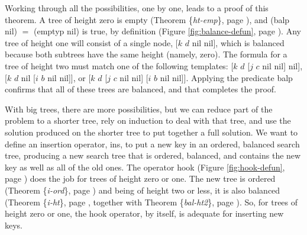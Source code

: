 Working through all the possibilities, one by one,
leads to a proof of this theorem.
A tree of height zero is empty
(Theorem \{\emph{ht-emp}\}, page \pageref{thm:ht-emp}),
and \textsf{(balp nil)} $=$ \textsf{(emptyp nil)} is true, by definition
(Figure \ref{fig:balance-defun}, page \pageref{fig:balance-defun}).
Any tree of height one will consist of a single node,
\textsf{[$k$ $d$ nil nil]}, which is balanced because both subtrees
have the same height (namely, zero).
The formula for a tree of height two must match one of the following templates:
\textsf{[$k$ $d$ [$j$ $c$ nil nil] nil]}, \textsf{[$k$ $d$ nil [$i$ $b$ nil nil]]},
or \textsf{[$k$ $d$ [$j$ $c$ nil nil] [$i$ $b$ nil nil]]}.
Applying the predicate \textsf{balp}
confirms that all of these trees are balanced,
and that completes the proof.

With big trees, there are more possibilities,
but we can reduce part of the problem to
a shorter tree, rely on induction to deal with that tree,
and use the solution produced on the shorter tree
to put together a full solution.
We want to define an insertion operator, \textsf{ins},
to put a new key in
an ordered, balanced search tree,
producing a new search tree that is ordered, balanced,
and contains the new key as well as all of the old ones.
The operator \textsf{hook} (Figure \ref{fig:hook-defun}, page \pageref{fig:hook-defun})
does the job for trees of height zero or one.
The new tree is ordered (Theorem \{\emph{i-ord}\}, page \pageref{thm:i-ord})
and being of height two or less, it is also balanced
(Theorem \{\emph{i-ht}\}, page \pageref{thm:i-ht},
together with Theorem \{\emph{bal-ht2}\}, page \pageref{thm:bal-ht2}).
So, for trees of height zero or one,
the \textsf{hook} operator, by itself, is adequate for
inserting new keys.

